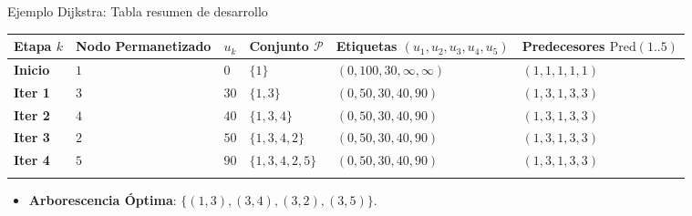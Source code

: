 \documentclass[
  ignorenonframetext,
]{beamer}
\providecommand{\tightlist}{%
  \setlength{\itemsep}{0pt}\setlength{\parskip}{0pt}}
\begin{document}
\begin{frame}{Ejemplo Dijkstra: Tabla resumen de desarrollo}
\label{ejemplo-dijkstra-tabla-resumen-de-desarrollo}
\begin{longtable}[]{@{}
  >{\raggedright\arraybackslash}p{}
  >{\raggedright\arraybackslash}p{}
  >{\raggedright\arraybackslash}p{}
  >{\raggedright\arraybackslash}p{}
  >{\raggedright\arraybackslash}p{}
  >{\raggedright\arraybackslash}p{}@{}}
\toprule\noalign{}
\begin{minipage}[b]{\linewidth}\raggedright
Etapa \(k\)
\end{minipage} & \begin{minipage}[b]{\linewidth}\raggedright
Nodo Permanetizado
\end{minipage} & \begin{minipage}[b]{\linewidth}\raggedright
\(u_k\)
\end{minipage} & \begin{minipage}[b]{\linewidth}\raggedright
Conjunto \(\mathcal{P}\)
\end{minipage} & \begin{minipage}[b]{\linewidth}\raggedright
Etiquetas \((u_1, u_2, u_3, u_4, u_5)\)
\end{minipage} & \begin{minipage}[b]{\linewidth}\raggedright
Predecesores \(\text{Pred}(1..5)\)
\end{minipage} \\
\midrule\noalign{}
\endhead
\textbf{Inicio} & \(1\) & \(0\) & \(\{1\}\) &
\((0, 100, 30, \infty, \infty)\) & \((1, 1, 1, 1, 1)\) \\
\textbf{Iter 1} & \(3\) & \(30\) & \(\{1, 3\}\) &
\((0, 50, 30, 40, 90)\) & \((1, 3, 1, 3, 3)\) \\
\textbf{Iter 2} & \(4\) & \(40\) & \(\{1, 3, 4\}\) &
\((0, 50, 30, 40, 90)\) & \((1, 3, 1, 3, 3)\) \\
\textbf{Iter 3} & \(2\) & \(50\) & \(\{1, 3, 4, 2\}\) &
\((0, 50, 30, 40, 90)\) & \((1, 3, 1, 3, 3)\) \\
\textbf{Iter 4} & \(5\) & \(90\) & \(\{1, 3, 4, 2, 5\}\) &
\((0, 50, 30, 40, 90)\) & \((1, 3, 1, 3, 3)\) \\
\bottomrule\noalign{}
\end{longtable}

\begin{itemize}
\tightlist
\item
  \textbf{Arborescencia Óptima}: \(\{ (1,3), (3,4), (3,2), (3,5) \}\).
\end{itemize}
\end{frame}
\end{document}
